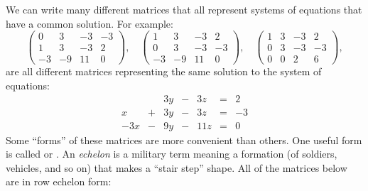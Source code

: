 \documentclass{ximera}
\begin{document}
We can write many different matrices that all represent systems
of equations that have a common solution. For example:
\[
\begin{pmatrix}
 0 &   3 & -3 & -3 \\
  1 &   3 & -3 & 2  \\
  -3& -9  & 11 & 0
\end{pmatrix},
\quad
\begin{pmatrix}
  1 &   3 & -3 & 2  \\
  0 &   3 & -3 & -3 \\
  -3& -9  & 11 & 0
\end{pmatrix},
\quad
\begin{pmatrix}
  1 &   3 & -3 & 2  \\
  0 &   3 & -3 & -3 \\
  0& 0  & 2 & 6
\end{pmatrix},
\]
are all different matrices representing the same solution to the
system of equations:
\[
  \begin{array}{ccccccc}
    & & 3y &-& 3z &=& 2 \\
    x& +&3y&-&3z&=&-3\\
    -3x& -&9y&-&11z&=&0
  \end{array}
\]
Some ``forms'' of these matrices are more convenient than others. One
useful form is called  or . An \textit{echelon} is a military term meaning a formation
(of soldiers, vehicles, and so on) that makes a ``stair step''
shape. All of the matrices below are in row echelon form:
\end{document}
